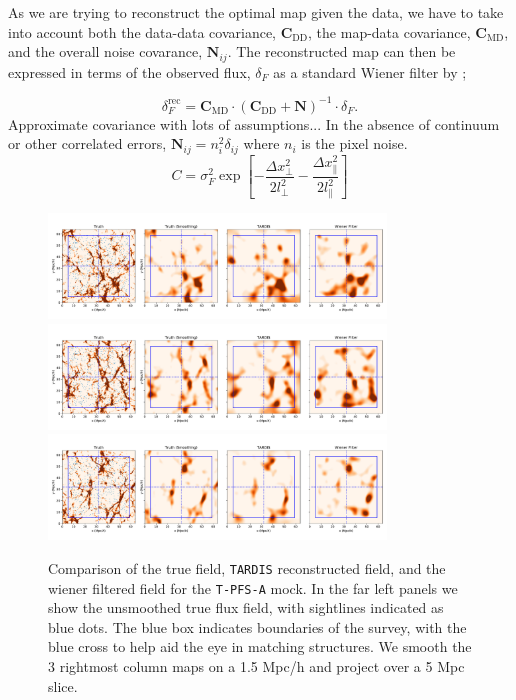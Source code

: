 \documentclass[times]{aastex62}
\begin{document}
As we are trying to reconstruct the optimal map given the data, we have to take into account both the data-data covariance, $\textbf{C}_{\textrm{DD}}$, the map-data covariance, $\textbf{C}_{\textrm{MD}}$, and the overall noise covarance, $\textbf{N}_{ij}$. The reconstructed map can then be expressed in terms of the observed flux, $\delta_F$ as a standard Wiener filter by ;

\begin{equation}
\delta_F^{\textrm{rec}} = \textbf{C}_{\textrm{MD}} \cdot
(\textbf{C}_{\textrm{DD}} + \textbf{N})^{-1} \cdot \delta_F.
\label{eqn:wiener}
\end{equation}
Approximate covariance with lots of assumptions... In the absence of continuum or other correlated errors, $\textbf{N}_{ij}
= n_i^2 \delta_{ij}$ where $n_i$ is the pixel noise.
\begin{equation}
C = \sigma_F^2 \exp{\left[-\frac{\Delta x_{\perp}^2}{2 l_{\perp}^2}
- \frac{\Delta x_{\parallel}^2}{2 l_{\parallel}^2}
\right]}
\label{eqn:covariance}
\end{equation}




\begin{figure}

  \centering  \includegraphics[trim=0cm 0cm 0cm 0cm,width=0.80\textwidth]{./figs_treepm/wf_comparison/wf_compare_pfs14.pdf}
  \centering  \includegraphics[trim=0cm 0cm 0cm 0cm,width=0.80\textwidth]{./figs_treepm/wf_comparison/wf_compare_pfs64.pdf}
  \centering  \includegraphics[trim=0cm 0cm 0cm 0cm,width=0.80\textwidth]{./figs_treepm/wf_comparison/wf_compare_pfs114.pdf}
    \caption{Comparison of the true field, \texttt{TARDIS} reconstructed field, and the wiener filtered field for the \texttt{T-PFS-A} mock. In the far left panels we show the unsmoothed true flux field, with sightlines indicated as blue dots. The blue box indicates boundaries of the survey, with the blue cross to help aid the eye in matching structures. We smooth the 3 rightmost column maps on a 1.5 Mpc/h and project over a 5 Mpc slice.} 
    \label{fig_wfcompare}
\end{figure}




%

\end{document}

